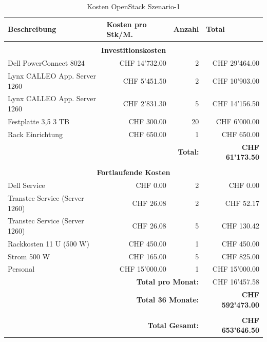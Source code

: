 \begin{table}[htbp]
\caption{Kosten OpenStack Szenario-1}
\begin{small}
\begin{tabular}{|l|r|r|r|}
\hline
\textbf{Beschreibung} & \multicolumn{1}{l|}{\textbf{Kosten pro Stk/M.}} & \multicolumn{1}{l|}{\textbf{Anzahl}} & \multicolumn{1}{l|}{\textbf{Total}} \\ \hline
 \multicolumn{ 4}{c}{} \\ \hline
\multicolumn{ 4}{|c|}{\textbf{Investitionskosten}} \\ \hline
Dell PowerConnect 8024 & CHF 14'732.00 & 2 & CHF 29'464.00 \\ \hline
Lynx CALLEO App. Server 1260 & CHF 5'451.50 & 2 & CHF 10'903.00 \\ \hline
Lynx CALLEO App. Server 1260 & CHF 2'831.30 & 5 & CHF 14'156.50 \\ \hline
Festplatte 3,5 3 TB & CHF 300.00 & 20 & CHF 6'000.00 \\ \hline
Rack Einrichtung & CHF 650.00 & 1 & CHF 650.00 \\ \hline \hline
 \multicolumn{ 3}{r|}{\textbf{Total:}} & \textbf{CHF 61'173.50} \\ 
 \cline{4-4}
\multicolumn{ 4}{c}{} \\ \hline
\multicolumn{ 4}{|c|}{\textbf{Fortlaufende Kosten}} \\ \hline
Dell Service & CHF 0.00 & 2 & CHF 0.00 \\ \hline
Transtec Service (Server 1260) & CHF 26.08 & 2 & CHF 52.17 \\ \hline
Transtec Service (Server 1260) & CHF 26.08 & 5 & CHF 130.42 \\ \hline
Rackkosten 11 U (500 W) & CHF 450.00 & 1 & CHF 450.00 \\ \hline
Strom 500 W & CHF 165.00 & 5 & CHF 825.00 \\ \hline
Personal & CHF 15'000.00 & 1 & CHF 15'000.00 \\ \hline \hline
 \multicolumn{ 3}{r|}{\textbf{Total pro Monat:}} & CHF 16'457.58 \\
\cline{4-4}
 \multicolumn{ 3}{r|}{\textbf{Total 36 Monate:}} & \textbf{CHF 592'473.00} \\ \cline{4-4}
 \multicolumn{ 4}{c}{} \\ \cline{4-4}
 \multicolumn{ 3}{r|}{\textbf{Total Gesamt:}} & \textbf{CHF 653'646.50} \\ \cline{4-4}
\end{tabular}
\end{small}
\label{tab:KostenOpenStackS1}
\end{table}



